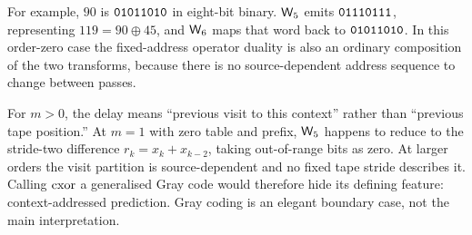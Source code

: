 For example, $90$ is $\text{\texttt{01011010}}$ in eight-bit binary.  $\mathsf{W}_{5}$ emits
$\text{\texttt{01110111}}$, representing $119=90\oplus45$, and $\mathsf{W}_{6}$ maps that word back to
$\text{\texttt{01011010}}$.  In this order-zero case the fixed-address operator duality is also an ordinary
composition of the two transforms, because there is no source-dependent address sequence to
change between passes.

For $m>0$, the delay means ``previous visit to this context'' rather than ``previous tape
position.''  At $m=1$ with zero table and prefix, $\mathsf{W}_{5}$ happens to reduce to the stride-two
difference $r_k=x_k+x_{k-2}$, taking out-of-range bits as zero.  At larger orders the visit
partition is source-dependent and no fixed tape stride describes it.  Calling $\mathrm{cxor}$ a
generalised Gray code would therefore hide its defining feature: context-addressed prediction.
Gray coding is an elegant boundary case, not the main interpretation.
